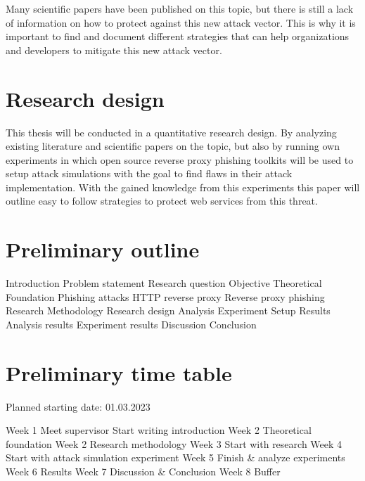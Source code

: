 \documentclass [14pt]{extarticle}
\begin{document}
Many scientific papers have been published on this topic, but there is still a lack of information on how to protect against this new attack vector. This is why it is important to find and document different strategies that can help organizations and developers to mitigate this new attack vector.

\section{Research design}
This thesis will be conducted in a quantitative research design. By analyzing existing literature and scientific papers on the topic, but also by running own experiments in which open source reverse proxy phishing toolkits will be used to setup attack simulations with the goal to find flaws in their attack implementation. With the gained knowledge from this experiments this paper will outline easy to follow strategies to protect web services from this threat.

\newpage
\section{Preliminary outline}
\begin{outline}[enumerate]
	\1 Introduction
		\2 Problem statement
		\2 Research question
		\2 Objective
	\1 Theoretical Foundation
		\2 Phishing attacks
		\2 HTTP reverse proxy
		\2 Reverse proxy phishing
	\1 Research Methodology
		\2 Research design
		\2 Analysis
		\2 Experiment Setup
	\1 Results
		\2 Analysis results
		\2 Experiment results
	\1 Discussion
	\1 Conclusion
\end{outline}

\newpage
\section{Preliminary time table}
Planned starting date: 01.03.2023
\begin{outline}
		\1 Week 1
			\2 Meet supervisor
			\2 Start writing introduction
		\1 Week 2
			\2 Theoretical foundation
		\1 Week 2
			\2 Research methodology
		\1 Week 3
			\2 Start with research
		\1 Week 4
			\2 Start with attack simulation experiment
		\1 Week 5
			\2 Finish \& analyze experiments
		\1 Week 6
			\2 Results
		\1 Week 7
			\2 Discussion \& Conclusion
		\1 Week 8
			\2 Buffer
\end{outline}
\end{document}
